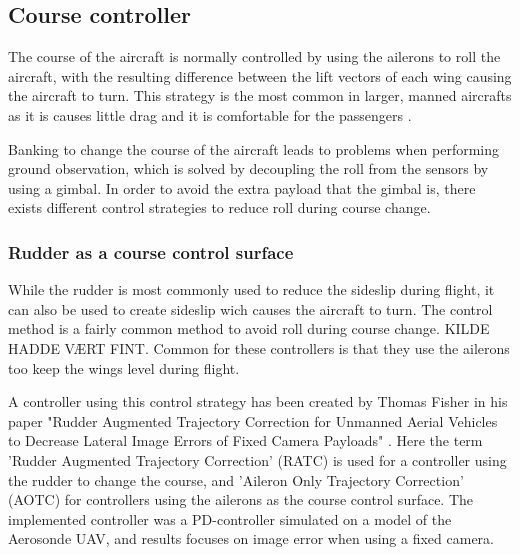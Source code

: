 \subsection{Course controller}
The course of the aircraft is normally controlled by using the ailerons to roll the aircraft, with the resulting difference between the lift vectors of each wing causing the aircraft to turn. This strategy is the most common in larger, manned aircrafts as it is causes little drag and it is comfortable for the passengers \cite{skidToTurnMills}.

Banking to change the course of the aircraft leads to problems when performing ground observation, which is solved by decoupling the roll from the sensors by using a gimbal. In order to avoid the extra payload that the gimbal is, there exists different control strategies to reduce roll during course change.


\subsubsection{Rudder as a course control surface}
While the rudder is most commonly used to reduce the sideslip during flight, it can also be used to create sideslip wich causes the aircraft to turn. The control method is a fairly common method to avoid roll during course change. KILDE HADDE VÆRT FINT. Common for these controllers is that they use the ailerons too keep the wings level during flight.

A controller using this control strategy has been created by Thomas Fisher in his paper "Rudder Augmented Trajectory Correction for
Unmanned Aerial Vehicles to Decrease Lateral Image Errors of Fixed Camera Payloads" \cite{ratcFISHER}. Here the term 'Rudder Augmented Trajectory Correction' (RATC) is used for a controller using the rudder to change the course, and 'Aileron Only Trajectory Correction' (AOTC) for controllers using the ailerons as the course control surface. The implemented controller was a PD-controller simulated on a model of the Aerosonde UAV, and results focuses on image error when using a fixed camera.


